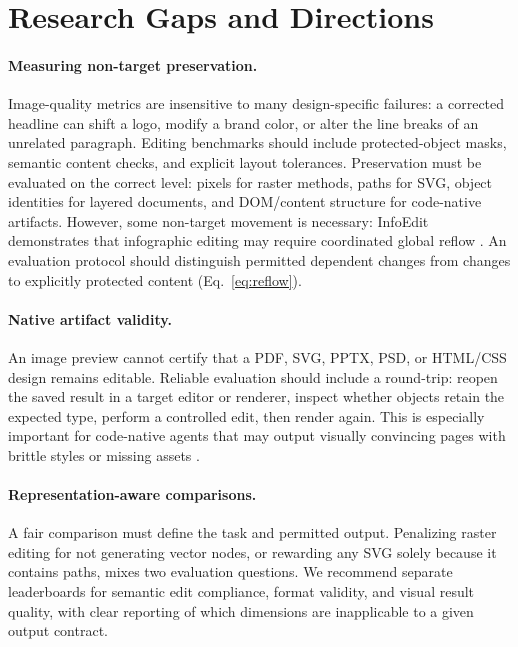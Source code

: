 \section{Research Gaps and Directions}
\label{sec:discussion}
\paragraph{Measuring non-target preservation.}
Image-quality metrics are insensitive to many design-specific failures: a corrected headline can shift a logo, modify a brand color, or alter the line breaks of an unrelated paragraph. Editing benchmarks should include protected-object masks, semantic content checks, and explicit layout tolerances. Preservation must be evaluated on the correct level: pixels for raster methods, paths for SVG, object identities for layered documents, and DOM/content structure for code-native artifacts. However, some non-target movement is necessary: InfoEdit demonstrates that infographic editing may require coordinated global reflow \citep{yang2026infoedit}. An evaluation protocol should distinguish permitted dependent changes from changes to explicitly protected content (Eq.~\ref{eq:reflow}).

\paragraph{Native artifact validity.}
An image preview cannot certify that a PDF, SVG, PPTX, PSD, or HTML/CSS design remains editable. Reliable evaluation should include a round-trip: reopen the saved result in a target editor or renderer, inspect whether objects retain the expected type, perform a controlled edit, then render again. This is especially important for code-native agents that may output visually convincing pages with brittle styles or missing assets \citep{designascode2026,editablevisual2026}.

\paragraph{Representation-aware comparisons.}
A fair comparison must define the task and permitted output. Penalizing raster editing for not generating vector nodes, or rewarding any SVG solely because it contains paths, mixes two evaluation questions. We recommend separate leaderboards for semantic edit compliance, format validity, and visual result quality, with clear reporting of which dimensions are inapplicable to a given output contract.

